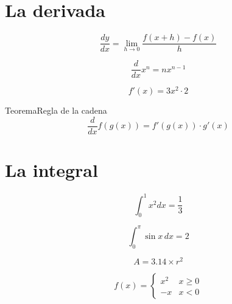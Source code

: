 \documentclass[10pt]{article}
\title{#1}\author{#2}\date{}%
\begin{document}
\begin{clcolumns}

\section*{La derivada}

\[
\frac{dy}{dx}= \lim_{h \to 0}\frac{f(x + h) - f(x)}{h}
\]

\[
\frac{d}{dx}x^{n} = n x^{n-1}
\]

\[
f'(x) = 3x^{2} \cdot 2
\]

\begin{cltheorem}{Teorema}{Regla de la cadena}
\[
\frac{d}{dx}f(g(x)) = f'(g(x)) \cdot g'(x)
\]
\end{cltheorem}

\section*{La integral}

\[
\int_{0}^{1} x^{2} dx = \frac{1}{3}
\]

\[
\int_{0}^{\pi}\sin x \, dx = 2
\]

\[
A = 3.14 \times r^{2}
\]

\[
f(x) = \begin{cases}x^{2}&x \geq 0 \\ -x&x < 0\end{cases}
\]
\end{clcolumns}
\end{document}
